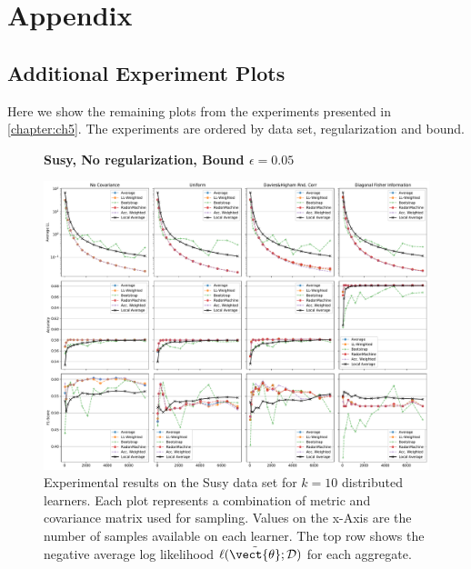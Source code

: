\chapter{Appendix}
\label{ch:apdx}
\section{Additional Experiment Plots}
Here we show the remaining plots from the experiments presented in \autoref{chapter:ch5}.
The experiments are ordered by data set, regularization and bound. 
\label{sec:apdx:exp}

    \begin{landscape}
    \begin{figure}
        \centering
        \textbf{Susy, No regularization, Bound $\epsilon=0.05$}\par\medskip
        \includegraphics[height=\dimexpr \textheight - 4\baselineskip\relax]{kapitel/figures/susy_None_0.05.pdf}
        \caption[Susy without regularization and $\epsilon=0.05$]{Experimental results on the Susy data set for $k=10$ distributed learners. Each plot represents a combination of metric and covariance matrix used for sampling. Values on the x-Axis are the number of samples available on each learner. The top row shows the negative average log likelihood $\ell(\tilde{\vect{\theta}}; \mathcal{D})$ for each aggregate.}
        \label{fig:analysis5}
    \end{figure}
    \end{landscape}
